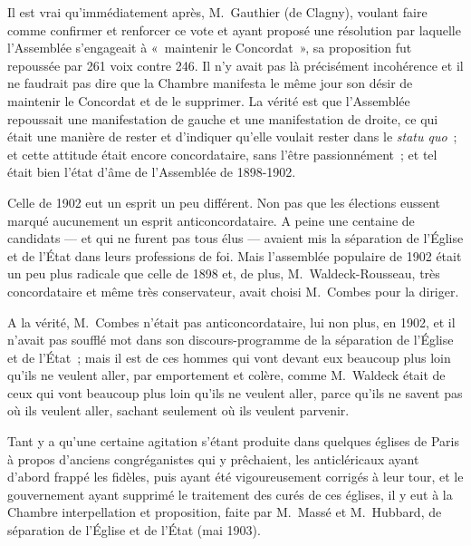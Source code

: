 \documentclass[french,twoside]{book} %
\begin{document}
Il est vrai qu’immédiatement après, M. Gauthier (de Clagny), voulant faire comme confirmer et renforcer ce vote et ayant proposé une résolution par laquelle l’Assemblée s’engageait à « maintenir le Concordat », sa proposition fut repoussée par 261 voix contre 246. Il n’y avait pas là précisément incohérence et il ne faudrait pas dire que la Chambre manifesta le même jour son désir de maintenir le Concordat et de le supprimer. La vérité est que l’Assemblée repoussait une manifestation de gauche et une manifestation de droite, ce qui était une manière de rester et d’indiquer qu’elle voulait rester dans le {\itshape statu  quo} ; et cette attitude était encore concordataire, sans l’être passionnément ; et tel était bien l’état d’âme de l’Assemblée de 1898-1902.\par
Celle de 1902 eut un esprit un peu différent. Non pas que les élections eussent marqué aucunement un esprit anticoncordataire. A peine une centaine de candidats — et qui ne furent pas tous élus — avaient mis la séparation de l’Église et de l’État dans leurs professions de foi. Mais l’assemblée populaire de 1902 était un peu plus radicale que celle de 1898 et, de plus, M. Waldeck-Rousseau, très concordataire et même très conservateur, avait choisi M. Combes pour la diriger.\par
A la vérité, M. Combes n’était pas anticoncordataire, lui non plus, en 1902, et il n’avait pas soufflé mot dans son discours-programme de la séparation de l’Église et de l’État ; mais il est de ces hommes qui vont devant eux beaucoup plus loin qu’ils ne veulent aller, par emportement et colère, comme M. Waldeck était de ceux qui vont beaucoup plus loin qu’ils ne veulent aller, parce qu’ils ne savent pas où ils veulent aller, sachant seulement où ils veulent parvenir.\par
Tant y a qu’une certaine agitation s’étant produite dans quelques églises de Paris à propos d’anciens congréganistes qui y prêchaient, les anticléricaux ayant d’abord frappé les fidèles, puis ayant  été vigoureusement corrigés à leur tour, et le gouvernement ayant supprimé le traitement des curés de ces églises, il y eut à la Chambre interpellation et proposition, faite par M. Massé et M. Hubbard, de séparation de l’Église et de l’État (mai 1903).\par
\end{document}
